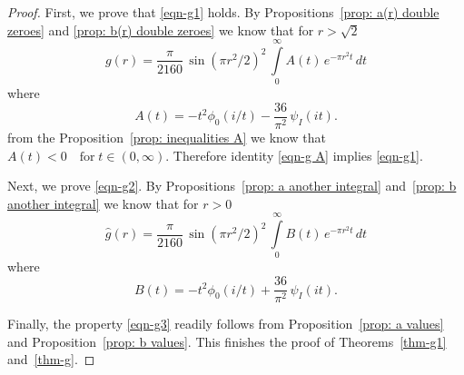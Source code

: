 \begin{proof}
First, we prove that \eqref{eqn-g1} holds. By Propositions~\ref{prop: a(r) double zeroes} and \ref{prop: b(r) double zeroes} we know that for $r>\sqrt{2}$
\begin{equation}\label{eqn-g A} g(r)=\frac{\pi}{2160}\,\sin(\pi r^2/2)^2\,\int\limits_0^\infty A(t)\,e^{-\pi r^2 t}\,dt\end{equation}
where $$A(t)=-t^2\phi_0(i/t)-\frac{36}{\pi^2}\,\psi_I(it).$$
from the Proposition~\ref{prop: inequalities A} we know that $A(t)<0\quad\mbox{for}\;t\in(0,\infty).$
Therefore identity \eqref{eqn-g A} implies \eqref{eqn-g1}.

Next, we prove \eqref{eqn-g2}. By Propositions~\ref{prop: a another integral} and~\ref{prop: b another integral} we know that for $r>0$
\begin{equation}\label{eqn-g B} \widehat{g}(r)=\frac{\pi}{2160}\,\sin(\pi r^2/2)^2\,\int\limits_0^\infty B(t)\,e^{-\pi r^2 t}\,dt\end{equation}
where $$B(t)=-t^2\phi_0(i/t)+\frac{36}{\pi^2}\,\psi_I(it).$$


Finally, the property \eqref{eqn-g3} readily follows from Proposition~\ref{prop: a values} and Proposition~\ref{prop: b values}.
This finishes the proof of Theorems~\ref{thm-g1} and~\ref{thm-g}.
  \end{proof}




